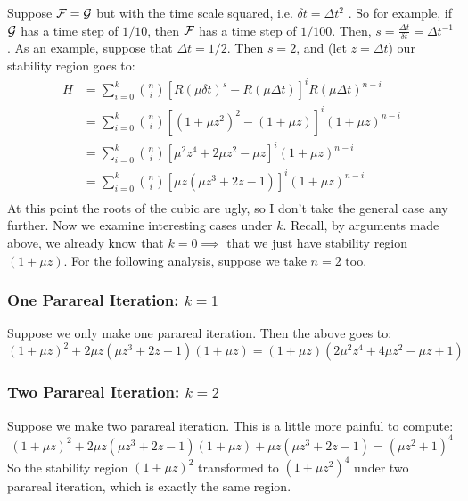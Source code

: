 Suppose $\mathcal{F} = \mathcal{G}$ but with the time scale squared, i.e. $\delta t =
\Delta t^2$ . So for example, if $\mathcal{G}$ has a time step of $1/10$, then
$\mathcal{F}$ has a time step of $1/100$.  Then, $s = \frac{\Delta t}{\delta t} =
\Delta t^{-1}$. As an example, suppose that $\Delta t = 1/2$. Then $s = 2$, and
(let $z = \Delta t$) our stability region goes to:
\begin{align*}
  H & = \sum_{i=0}^k \binom{n}{i} \left[ R(\mu \delta t)^s -
    R(\mu \Delta t) \right]^i R(\mu \Delta t)^{n-i} \\
  & = \sum_{i=0}^k \binom{n}{i} \left[ (1+\mu z^2)^2 -
    (1+\mu z) \right]^i (1+\mu z)^{n-i} \\
  & = \sum_{i=0}^k \binom{n}{i} 
    \left[ 
      \mu^2 z^4 + 2\mu z^2 - \mu z 
    \right]^i (1+\mu z)^{n-i} \\
  & = \sum_{i=0}^k \binom{n}{i} 
    \left[ 
      \mu z(\mu z^3 + 2 z - 1)
    \right]^i (1+\mu z)^{n-i} \\
\end{align*}
At this point the roots of the cubic are ugly, so I don't take the general case
any further. Now we examine interesting cases under $k$. Recall, by arguments
made above, we already know that $k = 0 \implies$ that we just have stability
region $(1 + \mu z)$. For the following analysis, suppose we take $n = 2$ too.

\subsubsection{One Parareal Iteration: $k = 1$}

Suppose we only make one parareal iteration. Then the above goes to:
\[
  (1 + \mu z)^2 + 2\mu z(\mu z^3 + 2z - 1)(1+\mu z) = (1+\mu z)(2\mu^2 z^4 +
  4\mu z^2  - \mu z + 1)
\]

\subsubsection{Two Parareal Iteration: $k = 2$}

Suppose we make two parareal iteration. This is a little more painful to
compute:
\[
  (1 + \mu z)^2 + 2\mu z(\mu z^3 + 2z - 1)(1+\mu z) + \mu z(\mu z^3 + 2 z - 1) =
  (\mu z^2 + 1)^4
\]
So the stability region $(1 + \mu z)^2$ transformed to $(1 + \mu z^2)^4$ under
two parareal iteration, which is exactly the same region.

